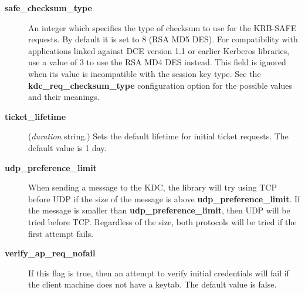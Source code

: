 \documentclass[letterpaper,10pt,english]{sphinxmanual}
\begin{document}
\begin{description}
\item[{\textbf{safe\_checksum\_type}}] \leavevmode
An integer which specifies the type of checksum to use for the
KRB-SAFE requests.  By default it is set to 8 (RSA MD5 DES).  For
compatibility with applications linked against DCE version 1.1 or
earlier Kerberos libraries, use a value of 3 to use the RSA MD4
DES instead.  This field is ignored when its value is incompatible
with the session key type.  See the \textbf{kdc\_req\_checksum\_type}
configuration option for the possible values and their meanings.

\item[{\textbf{ticket\_lifetime}}] \leavevmode
(\emph{duration} string.)  Sets the default lifetime for initial
ticket requests.  The default value is 1 day.

\item[{\textbf{udp\_preference\_limit}}] \leavevmode
When sending a message to the KDC, the library will try using TCP
before UDP if the size of the message is above
\textbf{udp\_preference\_limit}.  If the message is smaller than
\textbf{udp\_preference\_limit}, then UDP will be tried before TCP.
Regardless of the size, both protocols will be tried if the first
attempt fails.

\item[{\textbf{verify\_ap\_req\_nofail}}] \leavevmode
If this flag is true, then an attempt to verify initial
credentials will fail if the client machine does not have a
keytab.  The default value is false.

\end{description}
\end{document}
